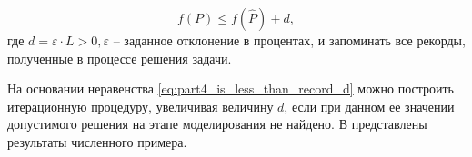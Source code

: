 \begin{equation}
    \label{eq:part4_is_less_than_record_d}
    f(P) \leqslant f(\widehat{P}) + d,
\end{equation}
где $d = \varepsilon \cdot L > 0, \varepsilon$ -- заданное отклонение в процентах, и запоминать все рекорды, полученные в процессе решения задачи.

На основании неравенства \cref{eq:part4_is_less_than_record_d} можно построить итерационную процедуру, увеличивая величину $d$, если при данном ее значении допустимого решения на этапе моделирования не найдено.
В  представлены результаты численного примера.











